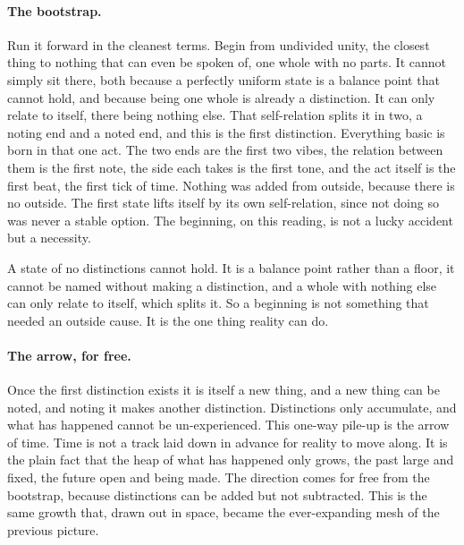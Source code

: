 \paragraph{The bootstrap.}
Run it forward in the cleanest terms. Begin from undivided unity, the closest thing to nothing
that can even be spoken of, one whole with no parts. It cannot simply sit there, both because a
perfectly uniform state is a balance point that cannot hold, and because being one whole is
already a distinction. It can only relate to itself, there being nothing else. That
self-relation splits it in two, a noting end and a noted end, and this is the first
distinction. Everything basic is born in that one act. The two ends are the first two vibes,
the relation between them is the first note, the side each takes is the first tone, and the act
itself is the first beat, the first tick of time. Nothing was added from outside, because there
is no outside. The first state lifts itself by its own self-relation, since not doing so was
never a stable option. The beginning, on this reading, is not a lucky accident but a
necessity.

\begin{principle}
A state of no distinctions cannot hold. It is a balance point rather than a floor, it cannot be
named without making a distinction, and a whole with nothing else can only relate to itself,
which splits it. So a beginning is not something that needed an outside cause. It is the one
thing reality can do.
\end{principle}

\paragraph{The arrow, for free.}
Once the first distinction exists it is itself a new thing, and a new thing can be noted, and
noting it makes another distinction. Distinctions only accumulate, and what has happened cannot
be un-experienced. This one-way pile-up is the arrow of time. Time is not a track laid down in
advance for reality to move along. It is the plain fact that the heap of what has happened only
grows, the past large and fixed, the future open and being made. The direction comes for free
from the bootstrap, because distinctions can be added but not subtracted. This is the same
growth that, drawn out in space, became the ever-expanding mesh of the previous picture.

